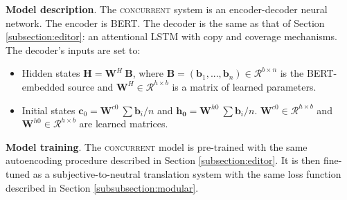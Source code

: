 \textbf{Model description}. The \textsc{concurrent} system is an encoder-decoder neural network. The encoder is BERT. The decoder is the same as that of Section \ref{subsection:editor}: an attentional LSTM with copy and coverage mechanisms. The decoder's inputs are set to: 
\begin{itemize}
	\item Hidden states $\mathbf{H} = \mathbf{W}^H\ \mathbf{B}$, where $\mathbf{B} = (\mathbf{b}_1, ..., \mathbf{b}_{n}) \in \mathcal{R}^{b \times n}$ is the BERT-embedded source and $\mathbf{W}^H \in \mathcal{R}^{h \times b}$ is a matrix of learned parameters.%
	\item Initial states $\mathbf{c}_0 =  \mathbf{W}^{c0}\ \sum \mathbf{b}_i / n$ and $\mathbf{h_0} = \mathbf{W}^{h0}\ \sum \mathbf{b}_i / n$. $\mathbf{W}^{c0} \in \mathcal{R}^{h \times b}$ and $\mathbf{W}^{h0} \in \mathcal{R}^{h \times b}$ are learned matrices.
\end{itemize}

\textbf{Model training}.
The \textsc{concurrent} model is pre-trained with the same autoencoding procedure described in Section \ref{subsection:editor}. It is then fine-tuned as a subjective-to-neutral translation system with the same loss function described in Section \ref{subsubsection:modular}.



